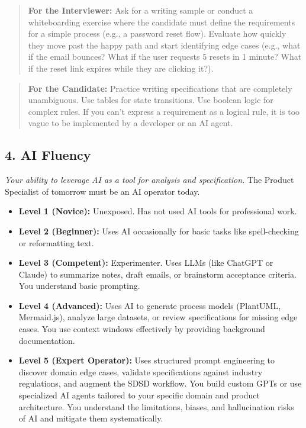 \begin{quote}
\textbf{For the Interviewer:} Ask for a writing sample or conduct a
whiteboarding exercise where the candidate must define the requirements
for a simple process (e.g., a password reset flow). Evaluate how quickly
they move past the happy path and start identifying edge cases (e.g.,
what if the email bounces? What if the user requests 5 resets in 1
minute? What if the reset link expires while they are clicking it?).
\end{quote}

\begin{quote}
\textbf{For the Candidate:} Practice writing specifications that are
completely unambiguous. Use tables for state transitions. Use boolean
logic for complex rules. If you can't express a requirement as a logical
rule, it is too vague to be implemented by a developer or an AI agent.
\end{quote}

\subsection{4. AI Fluency}\label{ai-fluency}

\emph{Your ability to leverage AI as a tool for analysis and
specification.} The Product Specialist of tomorrow must be an AI
operator today.

\begin{itemize}
\tightlist
\item
  \textbf{Level 1 (Novice):} Unexposed. Has not used AI tools for
  professional work.
\item
  \textbf{Level 2 (Beginner):} Uses AI occasionally for basic tasks like
  spell-checking or reformatting text.
\item
  \textbf{Level 3 (Competent):} Experimenter. Uses LLMs (like ChatGPT or
  Claude) to summarize notes, draft emails, or brainstorm acceptance
  criteria. You understand basic prompting.
\item
  \textbf{Level 4 (Advanced):} Uses AI to generate process models
  (PlantUML, Mermaid.js), analyze large datasets, or review
  specifications for missing edge cases. You use context windows
  effectively by providing background documentation.
\item
  \textbf{Level 5 (Expert Operator):} Uses structured prompt engineering
  to discover domain edge cases, validate specifications against
  industry regulations, and augment the SDSD workflow. You build custom
  GPTs or use specialized AI agents tailored to your specific domain and
  product architecture. You understand the limitations, biases, and
  hallucination risks of AI and mitigate them systematically.
\end{itemize}

